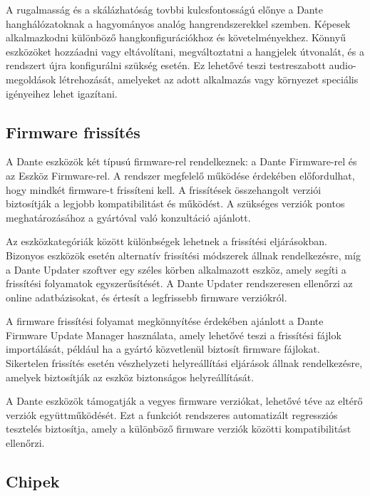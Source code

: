A rugalmasság és a skálázhatóság tovbbi kulcsfontosságú előnye a Dante
hanghálózatoknak a hagyományos analóg hangrendszerekkel szemben.
Képesek alkalmazkodni különböző hangkonfigurációkhoz és követelményekhez. 
Könnyű eszközöket hozzáadni vagy eltávolítani, megváltoztatni a hangjelek útvonalát, és a rendszert újra
konfigurálni szükség esetén. Ez lehetővé teszi testreszabott audio-megoldások
létrehozását, amelyeket az adott alkalmazás vagy környezet speciális igényeihez
lehet igazítani. 

\subsection{Firmware frissítés}

A Dante eszközök két típusú firmware-rel rendelkeznek: a Dante Firmware-rel és az 
Eszköz Firmware-rel. A rendszer megfelelő működése érdekében előfordulhat, hogy mindkét 
firmware-t frissíteni kell. A frissítések összehangolt verziói biztosítják a legjobb 
kompatibilitást és működést. A szükséges verziók pontos meghatározásához a gyártóval 
való konzultáció ajánlott.

Az eszközkategóriák között különbségek lehetnek a frissítési eljárásokban. Bizonyos 
eszközök esetén alternatív frissítési módszerek állnak rendelkezésre, míg a Dante 
Updater szoftver egy széles körben alkalmazott eszköz, amely segíti a frissítési 
folyamatok egyszerűsítését. A Dante Updater rendszeresen ellenőrzi az online 
adatbázisokat, és értesít a legfrissebb firmware verziókról.

A firmware frissítési folyamat megkönnyítése érdekében ajánlott a Dante Firmware 
Update Manager használata, amely lehetővé teszi a frissítési fájlok importálását, 
például ha a gyártó közvetlenül biztosít firmware fájlokat. Sikertelen frissítés 
esetén vészhelyzeti helyreállítási eljárások állnak rendelkezésre, amelyek biztosítják 
az eszköz biztonságos helyreállítását.

A Dante eszközök támogatják a vegyes firmware verziókat, lehetővé téve az eltérő 
verziók együttműködését. Ezt a funkciót rendszeres automatizált regressziós tesztelés 
biztosítja, amely a különböző firmware verziók közötti kompatibilitást ellenőrzi.


\subsection{Chipek}

